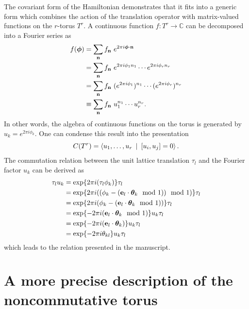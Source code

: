 \documentclass[
    10pt,
    aps,
    prb,
	longbibliography,
    twocolumn,
    floatfix,
    superscriptaddress,
]{revtex4-2}
\begin{document}
The covariant form of the Hamiltonian demonstrates that it fits into a generic form which combines the action of the translation operator with matrix-valued functions on the $r$-torus $T^r$. 
A continuous function $f\colon T^r \to \mathbb{C}$ can be decomposed into a Fourier series as
\begin{align}
	f( \boldsymbol{\phi} ) & = \sum_{\vec{n} }  f_{\vec{n} }~ e^{2 \pi i \boldsymbol{\phi} \cdot \vec{n} }
	\notag \\
	& = \sum_{\vec{n} }  f_{\vec{n} }~ e^{2 \pi i \phi_1 n_1 } \cdots e^{2 \pi i \phi_r n_r }
	\notag \\
	& = \sum_{\vec{n} }  f_{\vec{n} } ~( e^{2 \pi i \phi_1  } )^{n_1} \cdots ( e^{2 \pi i \phi_r  } )^{n_r} 
	\notag \\
	& \equiv \sum_{\vec{n} }  f_{\vec{n} } ~u_1^{n_1} \cdots u_r^{n_r} .
\end{align}
In other words, the algebra of continuous functions on the torus is generated by $u_k = e^{2 \pi i \phi_k  }$.
One can condense this result into the presentation 
\begin{equation}
	C(T^r) = \Braket{ u_1, \ldots, u_r ~|~ [u_i, u_j] = 0} .
\end{equation}
The commutation relation between the unit lattice translation $\tau_l$ and the Fourier factor $u_k$ can be derived as
\begin{align}
	\tau_l u_k &=
	\exp\lbrace 
	2 \pi i  (\tau_l \phi_k )
	\rbrace \tau_l
	\\ \notag 
	&=
	\exp\lbrace 
	2 \pi  i ( ( \phi_k - ( \vec{e}_l \cdot \boldsymbol{\theta}_k \mod 1) ) \mod 1 )
	\rbrace \tau_l
	\\ \notag 
	&=
	\exp\lbrace 
	2 \pi  i  ( \phi_k - ( \vec{e}_l \cdot \boldsymbol{\theta}_k \mod 1))
	\rbrace \tau_l
	\\ \notag  &= 
	\exp\lbrace 
	-2 \pi  i ( \vec{e}_l \cdot \boldsymbol{\theta}_k \mod 1)
	\rbrace u_k \tau_l
	\\ \notag  &= 
	\exp\lbrace 
	-2 \pi  i  (\vec{e}_l \cdot \boldsymbol{\theta}_k )
	\rbrace u_k \tau_l
	\\ \notag  &= 
	\exp\lbrace 
	-2 \pi  i  \theta_{kl} 
	\rbrace u_k \tau_l 
\end{align}
which leads to the relation presented in the manuscript.




\section{A more precise description of the noncommutative torus}
\label{app:operator_algebra}
\end{document}
